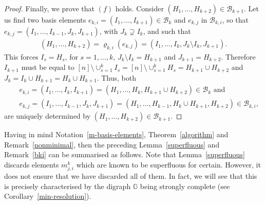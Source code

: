 \documentclass[ALCO]{cedram}
\newcommand{\mbg}{\mbox{$\mathbb{G}$}}
\newcommand{\mcb}{\mbox{$\mathcal{B}$}}
\begin{document}
\begin{proof}
Finally, we prove that $(f)$ holds. Consider $(H_1,\ldots
,H_{k+2})\in\mcb_{k+1}$. Let us find two basis elements
$e_{k,i}=(I_1,\ldots ,I_{k+1})\in\mcb_k$ and $e_{k,j}$ in
$\mcb_{k,i}$, so that $e_{k,j}=(I_1,\ldots ,I_{k-1},J_k,J_{k+1})$,
with $J_k\supsetneq I_k$, and such that
\begin{eqnarray*}
(H_1,\ldots ,H_{k+2})=\varrho_{k,i}(e_{k,j})=(I_1,\ldots
  ,I_k,J_k\setminus I_k,J_{k+1}).
\end{eqnarray*}
This forces $I_{s}=H_s$, for $s=1,\ldots ,k$, $J_{k}\setminus
I_k=H_{k+1}$ and $J_{k+1}=H_{k+2}$.  Therefore $I_{k+1}$ must be equal
to $[n]\setminus \cup_{s=1}^kI_s=[n]\setminus \cup_{s=1}^kH_s=H_{k+1}\cup
H_{k+2}$ and $J_k=I_k\cup H_{k+1}=H_k\cup H_{k+1}$.  Thus, both
\begin{eqnarray*}
&& e_{k,i}=(I_1,\ldots ,I_k,I_{k+1})=(H_1,\ldots ,H_k,H_{k+1}\cup
H_{k+2})\in\mcb_k\mbox{ and }\\ && e_{k,j}=(I_1,\ldots
,I_{k-1},J_k,J_{k+1})=(H_1,\ldots ,H_{k-1},H_{k}\cup
H_{k+1},H_{k+2})\in\mcb_{k,i},
\end{eqnarray*}
are uniquely determined by $(H_1,\ldots ,H_{k+2})\in\mcb_{k+1}$.
\end{proof}

Having in mind Notation~\ref{m-basis-elements},
Theorem~\ref{algorithm} and Remark~\ref{nonminimal}, then the
preceding Lemma~\ref{superfluous} and Remark~\ref{bki} can be
summarised as follows. Note that Lemma~\ref{superfluous} discards
elements $m^k_{j,i}$ which are known to be superfluous for
certain. However, it does not ensure that we have discarded all of
them. In fact, we will see that this is precisely characterised by the
digraph $\mbg$ being strongly complete (see
Corollary~\ref{min-resolution}).
\end{document}
